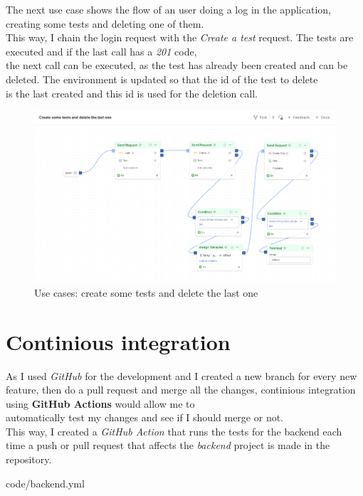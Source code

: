 The next use case shows the flow of an user doing a log in the application, creating some tests and deleting one of them. \\
This way, I chain the login request with the \textit{Create a test} request. The tests are executed and if the last call has a \textit{201} code, \\
the next call can be executed, as the test has already been created and can be deleted. The environment is updated so that the id of the test to delete \\
is the last created and this id is used for the deletion call.
\begin{figure}[H]
    \centering
        \includegraphics[angle=90, width=\textwidth, height=\textheight]{assets/postman_delete.png}
    \caption{Use cases: create some tests and delete the last one}
    \label{fig:test_createanddeleteatest}
\end{figure}

\section{Continious integration}
As I used \textit{GitHub} for the development and I created a new branch for every new feature, then do a pull request and merge all the changes, continious integration using \textbf{GitHub Actions} would allow me to \\
automatically test my changes and see if I should merge or not. \\

This way, I created a \textit{GitHub Action} that runs the tests for the backend each time a push or pull request that affects the \textit{backend} project is made in the repository.

{code/backend.yml}